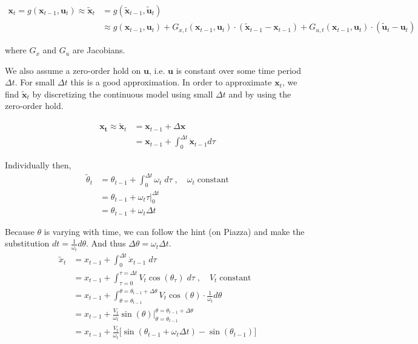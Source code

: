 \documentclass{article}
\begin{document}
\begin{enumerate}[label=(\roman*)]
\begin{equation}
\begin{aligned}
\mathbf{x}_t = g(\mathbf{x}_{t-1}, \mathbf{u}_t) \approx \tilde{\mathbf{x}}_t &= g(\tilde{\mathbf{x}}_{t-1}, \tilde{\mathbf{u}}_t) \\
&\approx g(\mathbf{x}_{t-1}, \mathbf{u}_t)
+ G_{x,t}(\mathbf{x}_{t-1}, \mathbf{u}_t)\cdot (\tilde{\mathbf{x}}_{t-1} - \mathbf{x}_{t-1})
+ G_{u,t}(\mathbf{x}_{t-1}, \mathbf{u}_t)\cdot (\tilde{\mathbf{u}}_t - \mathbf{u}_t)
\end{aligned}
\end{equation}

where $G_x$ and $G_u$ are Jacobians.

We also assume a zero-order hold on $\mathbf u$, i.e. $\mathbf{u}$ is constant over some time period $\Delta t$. For small $\Delta t$ this is a good approximation. In order to approximate $\mathbf{x}_t$, we find $\tilde{\mathbf{x}}_t$ by discretizing the continuous model using small $\Delta t$ and by using the zero-order hold.

\begin{equation}
\begin{aligned}
\mathbf{x_t} \approx \tilde{\mathbf{x}}_t &= \mathbf{x}_{t-1} + \Delta \mathbf{x} \\
&= \mathbf{x}_{t-1} + \int_0^{\Delta t} \mathbf{\dot x}_{t-1} d\tau
\end{aligned}
\end{equation}

Individually then,
\begin{equation}
\begin{aligned}
\tilde \theta_t &= \theta_{t-1} + \int_0^{\Delta t} \omega_t \; d\tau \;,\quad \omega_t \; \text{constant} \\
&= \theta_{t-1} + \omega_t \tau \big\rvert_0^{\Delta t} \\
&= \theta_{t-1} + \omega_t \Delta t
\end{aligned}
\end{equation}

Because $\theta$ is varying with time, we can follow the hint (on Piazza) and make the substitution $dt = \frac{1}{\omega_t} d\theta$. And thus $\Delta \theta = \omega_t \Delta t$.
\begin{equation}
\begin{aligned}
\tilde x_t &= x_{t-1} + \int_0^{\Delta t} \dot{x}_{t-1} \; d\tau \\
&= x_{t-1} + \int_{\tau=0}^{\tau=\Delta t} V_t \cos(\theta_\tau) \; d\tau \;,\quad V_t \; \text{constant} \\
&= x_{t-1} + \int_{\theta=\theta_{t-1}}^{\theta=\theta_{t-1}+\Delta \theta} V_t\cos(\theta) \cdot \frac{1}{\omega_t} d\theta \\
&= x_{t-1} + \frac{V_t}{\omega_t}\sin(\theta) \Big\rvert_{\theta=\theta_{t-1}}^{\theta=\theta_{t-1}+\Delta \theta} \\
&= x_{t-1} + \frac{V_t}{\omega_t} \Big[ \sin(\theta_{t-1} + \omega_t\Delta t) - \sin(\theta_{t-1}) \Big]
\end{aligned}
\end{equation}


\end{enumerate}
\end{document}
